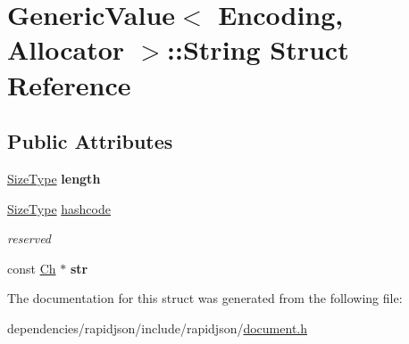 \hypertarget{struct_generic_value_1_1_string}{}\section{Generic\+Value$<$ Encoding, Allocator $>$\+:\+:String Struct Reference}
\label{struct_generic_value_1_1_string}
\subsection*{Public Attributes}
\begin{DoxyCompactItemize}
\item 
\mbox{\label{struct_generic_value_1_1_string_ad6ffab0e093aa8db6e415812ff6443bf}} 
\hyperlink{rapidjson_8h_a5ed6e6e67250fadbd041127e6386dcb5}{Size\+Type} {\bfseries length}
\item 
\mbox{\label{struct_generic_value_1_1_string_a73631052aeb72fbabb6eaab0175f858e}} 
\hyperlink{rapidjson_8h_a5ed6e6e67250fadbd041127e6386dcb5}{Size\+Type} \hyperlink{struct_generic_value_1_1_string_a73631052aeb72fbabb6eaab0175f858e}{hashcode}
\begin{DoxyCompactList}\small\item\em reserved \end{DoxyCompactList}\item 
\mbox{\label{struct_generic_value_1_1_string_a4eebc5acf3f93ab833efd82abf3ba84d}} 
const \hyperlink{class_generic_value_ade0e0ce64ccd5d852da57a35e720bafb}{Ch} $\ast$ {\bfseries str}
\end{DoxyCompactItemize}


The documentation for this struct was generated from the following file\+:\begin{DoxyCompactItemize}
\item 
dependencies/rapidjson/include/rapidjson/\hyperlink{document_8h}{document.\+h}\end{DoxyCompactItemize}
